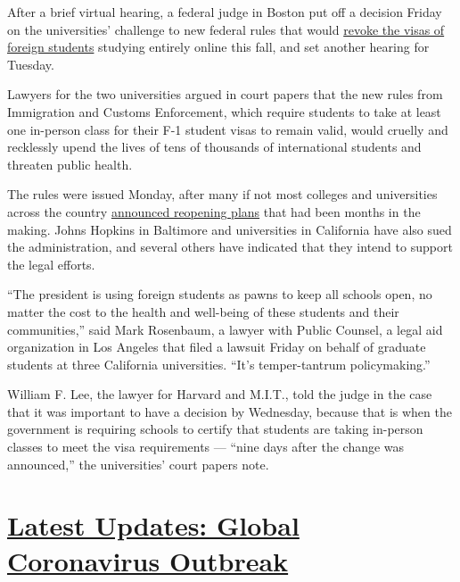 After a brief virtual hearing, a federal judge in Boston put off a
decision Friday on the universities' challenge to new federal rules that
would
\href{https://www.nytimes.com/2020/07/09/world/international-students-visa-reaction.html}{revoke
the visas of foreign students} studying entirely online this fall, and
set another hearing for Tuesday.

Lawyers for the two universities argued in court papers that the new
rules from Immigration and Customs Enforcement, which require students
to take at least one in-person class for their F-1 student visas to
remain valid, would cruelly and recklessly upend the lives of tens of
thousands of international students and threaten public health.

The rules were issued Monday, after many if not most colleges and
universities across the country
\href{https://www.nytimes.com/2020/07/06/us/coronavirus-universities-colleges-reopening.html}{announced
reopening plans} that had been months in the making. Johns Hopkins in
Baltimore and universities in California have also sued the
administration, and several others have indicated that they intend to
support the legal efforts.

``The president is using foreign students as pawns to keep all schools
open, no matter the cost to the health and well-being of these students
and their communities,'' said Mark Rosenbaum, a lawyer with Public
Counsel, a legal aid organization in Los Angeles that filed a lawsuit
Friday on behalf of graduate students at three California universities.
``It's temper-tantrum policymaking.''

William F. Lee, the lawyer for Harvard and M.I.T., told the judge in the
case that it was important to have a decision by Wednesday, because that
is when the government is requiring schools to certify that students are
taking in-person classes to meet the visa requirements --- ``nine days
after the change was announced,'' the universities' court papers note.

\hypertarget{latest-updates-global-coronavirus-outbreak}{%
\section{\texorpdfstring{\href{https://www.nytimes.com/2020/08/01/world/coronavirus-covid-19.html?action=click\&pgtype=Article\&state=default\&region=MAIN_CONTENT_1\&context=storylines_live_updates}{Latest
Updates: Global Coronavirus
Outbreak}}{Latest Updates: Global Coronavirus Outbreak}}\label{latest-updates-global-coronavirus-outbreak}}

